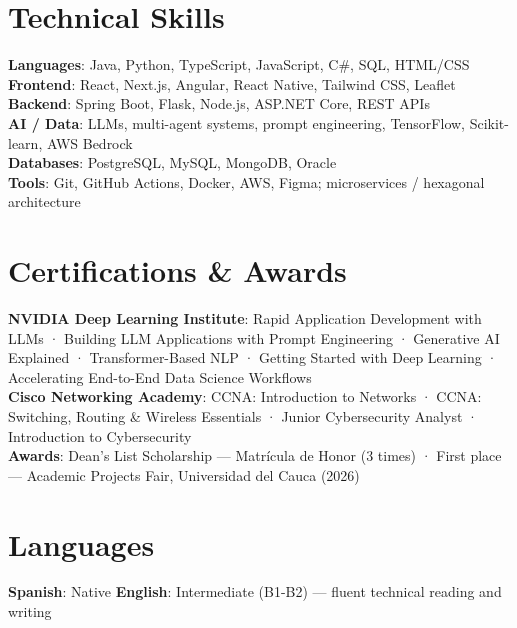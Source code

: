 \documentclass[letterpaper,11pt]{article}
\begin{document}
\section{Technical Skills}
 \begin{itemize}[leftmargin=0.15in, label={}]
    \small{\item{
     \textbf{Languages}{: Java, Python, TypeScript, JavaScript, C\#, SQL, HTML/CSS} \\
     \textbf{Frontend}{: React, Next.js, Angular, React Native, Tailwind CSS, Leaflet} \\
     \textbf{Backend}{: Spring Boot, Flask, Node.js, ASP.NET Core, REST APIs} \\
     \textbf{AI / Data}{: LLMs, multi-agent systems, prompt engineering, TensorFlow, Scikit-learn, AWS Bedrock} \\
     \textbf{Databases}{: PostgreSQL, MySQL, MongoDB, Oracle} \\
     \textbf{Tools}{: Git, GitHub Actions, Docker, AWS, Figma; microservices / hexagonal architecture}
    }}
 \end{itemize}

\section{Certifications \& Awards}
 \begin{itemize}[leftmargin=0.15in, label={}]
    \small{\item{
     \textbf{NVIDIA Deep Learning Institute}{: Rapid Application Development with LLMs · Building LLM Applications with Prompt Engineering · Generative AI Explained · Transformer-Based NLP · Getting Started with Deep Learning · Accelerating End-to-End Data Science Workflows} \\
     \textbf{Cisco Networking Academy}{: CCNA: Introduction to Networks · CCNA: Switching, Routing \& Wireless Essentials · Junior Cybersecurity Analyst · Introduction to Cybersecurity} \\
     \textbf{Awards}{: Dean's List Scholarship — Matrícula de Honor (3 times) · First place — Academic Projects Fair, Universidad del Cauca (2026)}
    }}
 \end{itemize}

\section{Languages}
 \begin{itemize}[leftmargin=0.15in, label={}]
    \small{\item{
     \textbf{Spanish}{: Native} \hspace{18pt} \textbf{English}{: Intermediate (B1-B2) — fluent technical reading and writing}
    }}
 \end{itemize}

\end{document}
